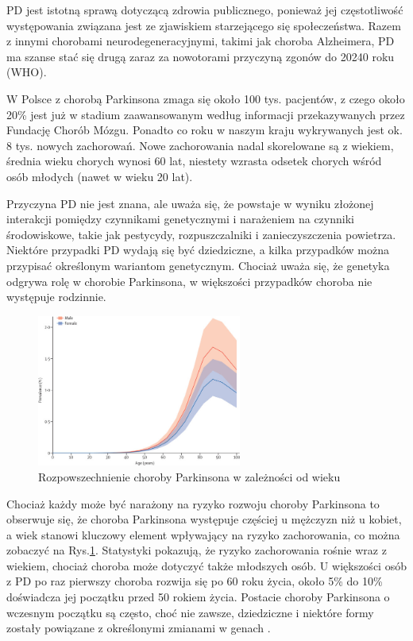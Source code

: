 PD jest istotną sprawą dotyczącą zdrowia publicznego, ponieważ jej częstotliwość występowania związana jest ze zjawiskiem starzejącego się społeczeństwa.
Razem z innymi chorobami neurodegeneracyjnymi, takimi jak choroba Alzheimera, PD ma szanse stać się drugą zaraz za nowotorami przyczyną zgonów do 20240 roku (WHO).

W Polsce z chorobą Parkinsona zmaga się około 100 tys. pacjentów, z czego około 20\% jest już w stadium zaawansowanym
według informacji przekazywanych przez Fundację Chorób Mózgu.
Ponadto co roku w naszym kraju wykrywanych jest ok. 8 tys. nowych zachorowań.
Nowe zachorowania nadal skorelowane są z wiekiem, średnia wieku chorych wynosi 60 lat, niestety wzrasta odsetek chorych wśród osób młodych (nawet w wieku 20 lat).

Przyczyna PD nie jest znana, ale uważa się, że powstaje w wyniku złożonej interakcji pomiędzy czynnikami genetycznymi i
narażeniem na czynniki środowiskowe, takie jak pestycydy, rozpuszczalniki i zanieczyszczenia powietrza.
Niektóre przypadki PD wydają się być dziedziczne, a kilka przypadków można przypisać określonym wariantom genetycznym.
Chociaż uważa się, że genetyka odgrywa rolę w chorobie Parkinsona, w większości przypadków choroba nie występuje rodzinnie\cite{National_Institute_on_Aging_2022}.

\begin{figure}[htbp]
	\centering
	\includegraphics[width=0.6\textwidth]{./img/PD_prevalence}
	\caption{Rozpowszechnienie choroby Parkinsona w zależności od wieku \cite{global_PD}}
    \label{fig:PD_prevalance}
\end{figure}

Chociaż każdy może być narażony na ryzyko rozwoju choroby Parkinsona to obserwuje się, że choroba Parkinsona występuje częściej u mężczyzn niż u kobiet,
a wiek stanowi kluczowy element wpływający na ryzyko zachorowania, co można zobaczyć na Rys.\ref{fig:PD_prevalance}.
Statystyki pokazują, że ryzyko zachorowania rośnie wraz z wiekiem, chociaż choroba może dotyczyć także młodszych osób.
U większości osób z PD po raz pierwszy choroba rozwija się po 60 roku życia, około 5\% do 10\% doświadcza jej początku przed 50 rokiem życia.
Postacie choroby Parkinsona o wczesnym początku są często, choć nie zawsze, dziedziczne i niektóre formy zostały powiązane z
określonymi zmianami w genach \cite{National_Institute_on_Aging_2022}.


